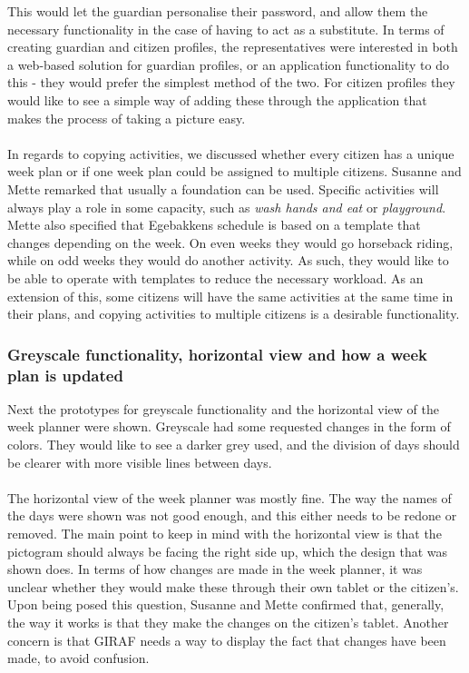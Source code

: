 This would let the guardian personalise their password, and allow them the necessary functionality in the case of having to act as a substitute.
In terms of creating guardian and citizen profiles, the representatives were interested in both a web-based solution for guardian profiles, or an application functionality to do this - they would prefer the simplest method of the two.
For citizen profiles they would like to see a simple way of adding these through the application that makes the process of taking a picture easy.
\\\\
In regards to copying activities, we discussed whether every citizen has a unique week plan or if one week plan could be assigned to multiple citizens.
Susanne and Mette remarked that usually a foundation can be used.
Specific activities will always play a role in some capacity, such as \textit{wash hands and eat} or \textit{playground}.
Mette also specified that Egebakkens schedule is based on a template that changes depending on the week.
On even weeks they would go horseback riding, while on odd weeks they would do another activity.
As such, they would like to be able to operate with templates to reduce the necessary workload.
As an extension of this, some citizens will have the same activities at the same time in their plans, and copying activities to multiple citizens is a desirable functionality.


\subsubsection{Greyscale functionality, horizontal view and how a week plan is updated}
Next the prototypes for greyscale functionality and the horizontal view of the week planner were shown.
Greyscale had some requested changes in the form of colors.
They would like to see a darker grey used, and the division of days should be clearer with more visible lines between days.
\\\\
The horizontal view of the week planner was mostly fine.
The way the names of the days were shown was not good enough, and this either needs to be redone or removed.
The main point to keep in mind with the horizontal view is that the pictogram should always be facing the right side up, which the design that was shown does.
In terms of how changes are made in the week planner, it was unclear whether they would make these through their own tablet or the citizen's.
Upon being posed this question, Susanne and Mette confirmed that, generally, the way it works is that they make the changes on the citizen's tablet.
Another concern is that GIRAF needs a way to display the fact that changes have been made, to avoid confusion.

